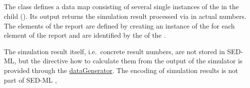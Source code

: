 %




\subsection{}
\label{class:report}
\label{class:listOfDataSets}
\begin{blockChanged}
The  class defines a data map consisting of several single instances of the \DataSet in the child  (). Its output returns the simulation result processed via \DataGenerators in actual numbers. The elements of the report are defined by creating an instance of the \DataSet for each element of the report and are identified by the  of the \DataSet. 
\end{blockChanged}

The simulation result itself, i.e.\ concrete result numbers, are not stored in SED-ML, but the directive how to calculate them from the output of the simulator is provided through the \hyperref[class:dataGenerator]{dataGenerator}. The encoding of simulation results is not part of SED-ML \currentLV, 

